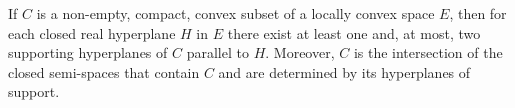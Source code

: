 If $C$ is a non-empty, compact, convex subset of a locally convex space $E$, then for each closed real hyperplane $H$ in $E$ there exist at least one and, at most, two supporting hyperplanes of $C$ parallel to $H$. Moreover, $C$ is the intersection of the closed semi-spaces that contain $C$ and are determined by its hyperplanes of support.
